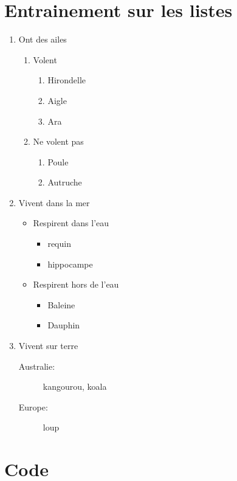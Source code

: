 \documentclass[12pt,a4paper]{scrartcl}
\begin{document}
\section{Entrainement sur les listes}
\begin{enumerate}
\item Ont des ailes
	\begin{enumerate}
	\item Volent
		\begin{enumerate}
		\item Hirondelle
		\item Aigle
		\item Ara
		\end{enumerate}
	\item Ne volent pas
		\begin{enumerate}
		\item Poule
		\item Autruche
		\end{enumerate}
	\end{enumerate}
	
\item Vivent dans la mer
	\begin{itemize}
	\item Respirent dans l'eau
		\begin{itemize}
		\item requin
		\item hippocampe
		\end{itemize}
	\item Respirent hors de l'eau
		\begin{itemize}
		\item Baleine
		\item Dauphin
		\end{itemize}
	\end{itemize}
	
\item Vivent sur terre
	\begin{description}
	\item[Australie:] kangourou, koala
	\item[Europe:] loup
	\end{description}	 
\end{enumerate}

\section{Code}


\end{document}
